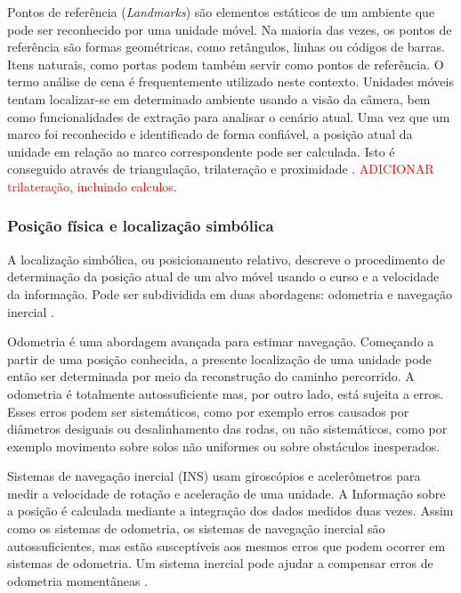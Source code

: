 Pontos de referência (\textit{Landmarks}) são elementos estáticos de um ambiente que pode ser reconhecido por uma unidade móvel. Na maioria das vezes, os pontos de referência são formas geométricas, como retângulos, linhas ou códigos de barras. Itens naturais, como portas podem também servir como pontos de referência. O termo  análise de cena é frequentemente utilizado neste contexto. Unidades móveis tentam localizar-se  em determinado ambiente usando a visão da câmera, bem como funcionalidades de extração para analisar o cenário atual. Uma vez que um marco foi reconhecido e identificado de forma confiável, a posição atual da unidade em relação ao marco correspondente pode ser calculada. Isto é conseguido através de triangulação, trilateração e proximidade \cite{linde2006aspects}.
 \textcolor{red}{ADICIONAR trilateração, incluindo calculos.}

\subsubsection{Posição física e localização simbólica}\label{sec:posic-fisica}

A localização simbólica, ou posicionamento relativo, descreve o procedimento de determinação da posição atual de um alvo móvel usando o curso e a velocidade da informação. Pode ser subdividida em duas abordagens: odometria e navegação inercial \cite{linde2006aspects}.

Odometria é uma abordagem avançada para estimar navegação. Começando a partir de uma posição conhecida, a presente localização de uma unidade pode então ser determinada por meio da reconstrução do caminho percorrido. A odometria é totalmente autossuficiente mas, por outro lado, está sujeita a erros. Esses erros podem ser sistemáticos, como por exemplo erros causados por diâmetros desiguais ou desalinhamento das rodas, ou não sistemáticos, como por exemplo movimento sobre solos não uniformes ou sobre obstáculos inesperados. 

Sistemas de navegação inercial (INS) usam giroscópios e acelerômetros para medir a velocidade de rotação e aceleração de uma unidade. A Informação sobre a posição é calculada mediante a integração dos dados medidos duas vezes. Assim como os sistemas de odometria, os sistemas de navegação inercial são autossuficientes, mas estão susceptíveis aos mesmos erros que podem ocorrer em sistemas de odometria. Um sistema inercial pode ajudar a compensar erros de odometria momentâneas \cite{linde2006aspects}.

